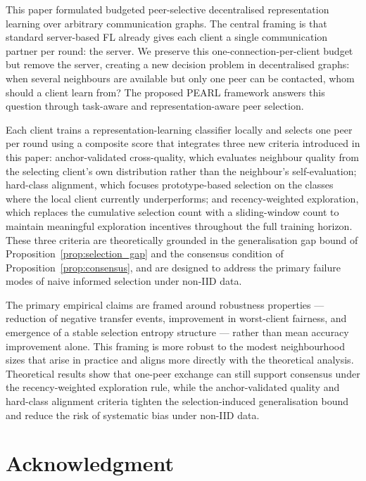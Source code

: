\documentclass[conference]{IEEEtran}
\begin{document}
This paper formulated budgeted peer-selective decentralised representation learning over arbitrary communication graphs. The central framing is that standard server-based FL already gives each client a single communication partner per round: the server. We preserve this one-connection-per-client budget but remove the server, creating a new decision problem in decentralised graphs: when several neighbours are available but only one peer can be contacted, whom should a client learn from? The proposed PEARL framework answers this question through task-aware and representation-aware peer selection.

Each client trains a representation-learning classifier locally and selects one peer per round using a composite score that integrates three new criteria introduced in this paper: anchor-validated cross-quality, which evaluates neighbour quality from the selecting client's own distribution rather than the neighbour's self-evaluation; hard-class alignment, which focuses prototype-based selection on the classes where the local client currently underperforms; and recency-weighted exploration, which replaces the cumulative selection count with a sliding-window count to maintain meaningful exploration incentives throughout the full training horizon. These three criteria are theoretically grounded in the generalisation gap bound of Proposition~\ref{prop:selection_gap} and the consensus condition of Proposition~\ref{prop:consensus}, and are designed to address the primary failure modes of naive informed selection under non-IID data.

The primary empirical claims are framed around robustness properties — reduction of negative transfer events, improvement in worst-client fairness, and emergence of a stable selection entropy structure — rather than mean accuracy improvement alone. This framing is more robust to the modest neighbourhood sizes that arise in practice and aligns more directly with the theoretical analysis. Theoretical results show that one-peer exchange can still support consensus under the recency-weighted exploration rule, while the anchor-validated quality and hard-class alignment criteria tighten the selection-induced generalisation bound and reduce the risk of systematic bias under non-IID data.

\section*{Acknowledgment}
\end{document}
